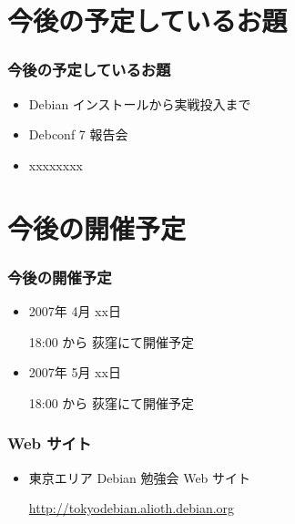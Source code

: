 \documentclass[cjk,dvipdfmx]{beamer}
\begin{document}
\section{今後の予定しているお題}
\begin{frame}
 \frametitle{今後の予定しているお題}
\begin{itemize}
  \item Debian インストールから実戦投入まで
  \item Debconf 7 報告会
  \item xxxxxxxx
\end{itemize}
\end{frame}

\section{今後の開催予定}
\begin{frame}
 \frametitle{今後の開催予定}
\begin{itemize}
  \item 2007年 4月 xx日

	18:00 から 荻窪にて開催予定
  \item 2007年 5月 xx日

	18:00 から 荻窪にて開催予定
\end{itemize}
\end{frame}

\begin{frame}
 \frametitle{Web サイト}
\begin{itemize}
  \item 東京エリア Debian 勉強会 Web サイト

	\url{http://tokyodebian.alioth.debian.org}
\end{itemize}
\end{frame}
\end{document}
